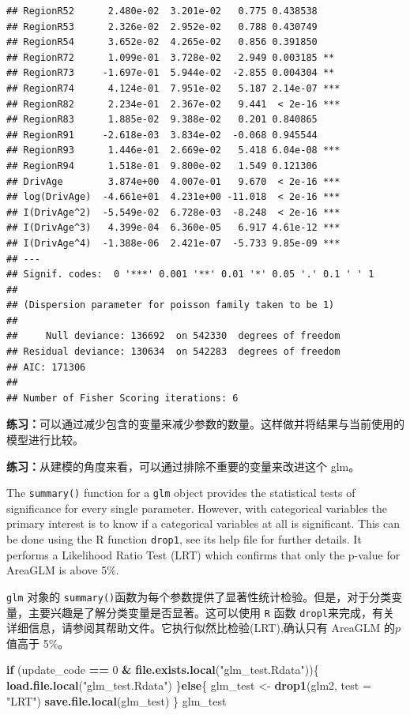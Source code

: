 \documentclass[
]{article}
\newenvironment{Shaded}{\begin{snugshade}}{\end{snugshade}}
\newcommand{\AttributeTok}[1]{\textcolor[rgb]{0.13,0.29,0.53}{#1}}
\newcommand{\ControlFlowTok}[1]{\textcolor[rgb]{0.13,0.29,0.53}{\textbf{#1}}}
\newcommand{\DecValTok}[1]{\textcolor[rgb]{0.00,0.00,0.81}{#1}}
\newcommand{\FunctionTok}[1]{\textcolor[rgb]{0.13,0.29,0.53}{\textbf{#1}}}
\newcommand{\NormalTok}[1]{#1}
\newcommand{\OtherTok}[1]{\textcolor[rgb]{0.56,0.35,0.01}{#1}}
\newcommand{\SpecialCharTok}[1]{\textcolor[rgb]{0.81,0.36,0.00}{\textbf{#1}}}
\newcommand{\StringTok}[1]{\textcolor[rgb]{0.31,0.60,0.02}{#1}}
\begin{document}
\begin{verbatim}
## RegionR52      2.480e-02  3.201e-02   0.775 0.438538    
## RegionR53      2.326e-02  2.952e-02   0.788 0.430749    
## RegionR54      3.652e-02  4.265e-02   0.856 0.391850    
## RegionR72      1.099e-01  3.728e-02   2.949 0.003185 ** 
## RegionR73     -1.697e-01  5.944e-02  -2.855 0.004304 ** 
## RegionR74      4.124e-01  7.951e-02   5.187 2.14e-07 ***
## RegionR82      2.234e-01  2.367e-02   9.441  < 2e-16 ***
## RegionR83      1.885e-02  9.388e-02   0.201 0.840865    
## RegionR91     -2.618e-03  3.834e-02  -0.068 0.945544    
## RegionR93      1.446e-01  2.669e-02   5.418 6.04e-08 ***
## RegionR94      1.518e-01  9.800e-02   1.549 0.121306    
## DrivAge        3.874e+00  4.007e-01   9.670  < 2e-16 ***
## log(DrivAge)  -4.661e+01  4.231e+00 -11.018  < 2e-16 ***
## I(DrivAge^2)  -5.549e-02  6.728e-03  -8.248  < 2e-16 ***
## I(DrivAge^3)   4.399e-04  6.360e-05   6.917 4.61e-12 ***
## I(DrivAge^4)  -1.388e-06  2.421e-07  -5.733 9.85e-09 ***
## ---
## Signif. codes:  0 '***' 0.001 '**' 0.01 '*' 0.05 '.' 0.1 ' ' 1
## 
## (Dispersion parameter for poisson family taken to be 1)
## 
##     Null deviance: 136692  on 542330  degrees of freedom
## Residual deviance: 130634  on 542283  degrees of freedom
## AIC: 171306
## 
## Number of Fisher Scoring iterations: 6
\end{verbatim}

\textbf{练习：}可以通过减少包含的变量来减少参数的数量。这样做并将结果与当前使用的模型进行比较。

\textbf{练习：}从建模的角度来看，可以通过排除不重要的变量来改进这个
glm。

The \texttt{summary()} function for a \texttt{glm} object provides the
statistical tests of significance for every single parameter. However,
with categorical variables the primary interest is to know if a
categorical variables at all is significant. This can be done using the
R function \texttt{drop1}, see its help file for further details. It
performs a Likelihood Ratio Test (LRT) which confirms that only the
p-value for AreaGLM is above 5\%.

\texttt{glm} 对象的
\texttt{summary()}函数为每个参数提供了显著性统计检验。但是，对于分类变量，主要兴趣是了解分类变量是否显著。这可以使用
\texttt{R} 函数
\texttt{dropl}来完成，有关详细信息，请参阅其帮助文件。它执行似然比检验(LRT),确认只有
AreaGLM 的\(p\)值高于 5\%。

\begin{Shaded}
\begin{Highlighting}[]
\ControlFlowTok{if}\NormalTok{ (update\_code }\SpecialCharTok{==} \DecValTok{0}  \SpecialCharTok{\&} \FunctionTok{file.exists.local}\NormalTok{(}\StringTok{"glm\_test.Rdata"}\NormalTok{))\{}
  \FunctionTok{load.file.local}\NormalTok{(}\StringTok{"glm\_test.Rdata"}\NormalTok{)}
\NormalTok{\}}\ControlFlowTok{else}\NormalTok{\{}
\NormalTok{  glm\_test }\OtherTok{\textless{}{-}} \FunctionTok{drop1}\NormalTok{(glm2, }\AttributeTok{test =} \StringTok{"LRT"}\NormalTok{)}
  \FunctionTok{save.file.local}\NormalTok{(glm\_test)}
\NormalTok{\}}
\NormalTok{glm\_test}
\end{Highlighting}
\end{Shaded}
\end{document}
